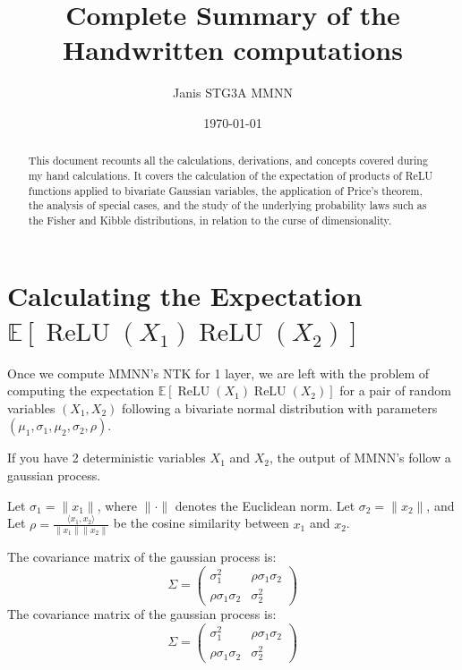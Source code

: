 \documentclass[11pt, a4paper]{article}
\title{Complete Summary of the Handwritten computations}
\author{Janis STG3A MMNN}
\date{\today}
\newcommand{\E}{\mathbb{E}}
\DeclareMathOperator{\ReLU}{ReLU}
\begin{document}
\maketitle

\begin{abstract}
This document recounts all the calculations, derivations, and concepts covered during my hand calculations. It covers the calculation of the expectation of products of ReLU functions applied to bivariate Gaussian variables, the application of Price's theorem, the analysis of special cases, and the study of the underlying probability laws such as the Fisher and Kibble distributions, in relation to the curse of dimensionality.
\end{abstract}

\newpage
\section{Calculating the Expectation $\E[\ReLU(X_1)\ReLU(X_2)]$}
Once we compute MMNN's NTK for 1 layer, we are left with the problem of computing the expectation $\E[\ReLU(X_1)\ReLU(X_2)]$ for a pair of random variables $(X_1, X_2)$ following a bivariate normal distribution with parameters $(\mu_1, \sigma_1, \mu_2, \sigma_2, \rho)$.

If you have 2 deterministic variables $X_1$ and $X_2$, the output of MMNN's follow a gaussian process.

Let $\sigma_1 = \|x_1\|$, where $\|\cdot\|$ denotes the Euclidean norm.
Let $\sigma_2 = \|x_2\|$, and
Let $\rho = \frac{\langle x_1, x_2 \rangle}{\|x_1\| \|x_2\|}$ be the cosine similarity between $x_1$ and $x_2$.

The covariance matrix of the gaussian process is:
\[
\Sigma = \begin{pmatrix}
\sigma_1^2 & \rho\sigma_1\sigma_2 \\
\rho\sigma_1\sigma_2 & \sigma_2^2
\end{pmatrix}
\]
The covariance matrix of the gaussian process is:
\[
\Sigma = \begin{pmatrix}
\sigma_1^2 & \rho\sigma_1\sigma_2 \\
\rho\sigma_1\sigma_2 & \sigma_2^2
\end{pmatrix}
\]
\end{document}
